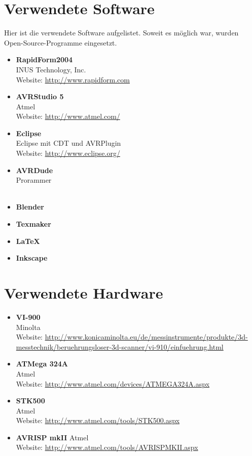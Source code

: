 \section{Verwendete Software}
\label{sec:V_Software}
Hier ist die verwendete Software aufgelistet. Soweit es möglich war, wurden Open-Source-Programme eingesetzt.
\begin{itemize}
\item \textbf{RapidForm2004} \\
INUS Technology, Inc.\\
Website: \url{http://www.rapidform.com}
\item \textbf{AVRStudio 5} \\
Atmel \\
Website: \url{http://www.atmel.com/}  
\item \textbf{Eclipse} \\
Eclipse mit CDT und AVRPlugin
\\
Website: \url{http://www.eclipse.org/}  
\item \textbf{AVRDude} \\
Prorammer \\
\\
\item \textbf{Blender}\\
\item \textbf{Texmaker}\\
\item \textbf{LaTeX}\\
\item \textbf{Inkscape}
\end{itemize}

\section{Verwendete Hardware}
\label{sec:V_Hardware}
\begin{itemize}
\item \textbf{VI-900}\\
Minolta\\
Website: \url{http://www.konicaminolta.eu/de/messinstrumente/produkte/3d-messtechnik/beruehrungsloser-3d-scanner/vi-910/einfuehrung.html}
\item \textbf{ATMega 324A}\\
Atmel\\
Website: \url{http://www.atmel.com/devices/ATMEGA324A.aspx}
\item \textbf{STK500}\\
Atmel\\
Website: \url{http://www.atmel.com/tools/STK500.aspx}
\item \textbf{AVRISP mkII}
Atmel\\
Website: \url{http://www.atmel.com/tools/AVRISPMKII.aspx}
\end{itemize}